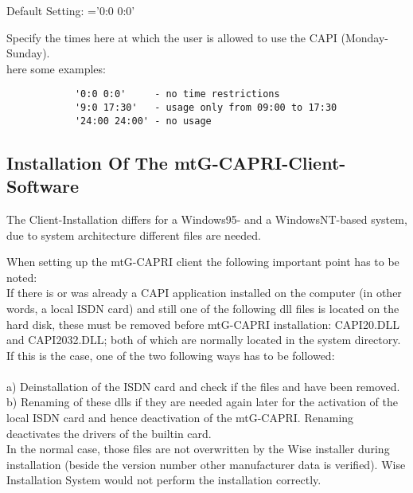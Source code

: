 \begin{description}

        Default Setting: ='0:0 0:0'

        Specify the times here at which the user is allowed to use the CAPI (Monday-Sunday).\\
        here some examples:
        \begin{verbatim}
            '0:0 0:0'     - no time restrictions
            '9:0 17:30'   - usage only from 09:00 to 17:30
            '24:00 24:00' - no usage
        \end{verbatim}


\end{description}

\subsection{Installation Of The mtG-CAPRI-Client-Software}
    The Client-Installation differs for a Windows95- and a WindowsNT-based system,
    due to system architecture different files are needed.

    When setting up the mtG-CAPRI client the following important point has to be noted: \\
    If there is or was already a CAPI application installed on the computer (in other words,
    a local ISDN card) and still one of the following dll files is located on the hard disk,
    these must be removed before mtG-CAPRI installation: CAPI20.DLL and CAPI2032.DLL;
    both of which are normally located in the system directory.\\

    If this is the case, one of the two following ways has to be followed:\\
    \\
    a) Deinstallation of the ISDN card and check if the files  and  have been removed.\\
    b) Renaming of these dlls if they are needed again later for the activation of the local ISDN card
    and hence deactivation of the mtG-CAPRI. Renaming deactivates the drivers of the builtin card.\\

    In the normal case, those files are not overwritten by the Wise installer during installation
    (beside the version number other manufacturer data is verified). Wise Installation System would
    not perform the installation correctly.

